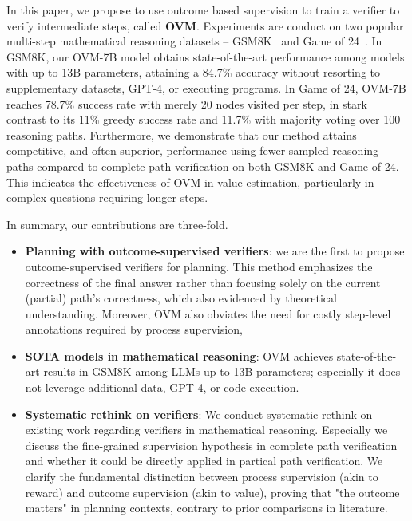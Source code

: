 \documentclass[11pt]{article}
\theoremstyle{plain}
\theoremstyle{claim}
\theoremstyle{rethinking}
\theoremstyle{researchquestion}
\theoremstyle{findings}
\theoremstyle{fact}
\theoremstyle{proper}
\theoremstyle{remark}
\begin{document}
In this paper, we propose to use outcome based supervision to train a verifier to verify intermediate steps, called \textbf{OVM}. Experiments are conduct on two popular multi-step mathematical reasoning datasets -- GSM8K~\citep{gsm8k21} and Game of 24~\citep{tot23}. In GSM8K, our OVM-7B model obtains state-of-the-art performance among models with up to 13B parameters, attaining a 84.7\% accuracy without resorting to supplementary datasets, GPT-4, or executing programs. 
In Game of 24,  OVM-7B reaches 78.7\% success rate with merely 20 nodes visited per step, in stark contrast to its 11\% greedy success rate and 11.7\% with majority voting over 100 reasoning paths. Furthermore, we demonstrate that our method attains competitive, and often superior, performance using fewer sampled reasoning paths compared to complete path verification on both GSM8K and Game of 24. This  indicates the effectiveness of OVM in value estimation, particularly in complex questions requiring longer steps.



In summary, our contributions are  three-fold.
\begin{itemize}

    


    \item  \textbf{Planning with outcome-supervised verifiers}: we are the first to propose   outcome-supervised verifiers for planning. This method emphasizes the correctness of the final answer rather than focusing solely on the current (partial) path’s correctness, which also evidenced by theoretical understanding. Moreover,  OVM also obviates the need for costly step-level annotations required by process supervision,
    
    \item \textbf{SOTA models in mathematical reasoning}:  OVM achieves state-of-the-art results in GSM8K among LLMs up to 13B parameters; especially it does not leverage  additional data, GPT-4, or code execution.
    


    \item \textbf{Systematic rethink on verifiers}: We conduct systematic rethink on existing work regarding verifiers in mathematical reasoning. Especially we discuss the fine-grained supervision hypothesis in complete path verification and whether it could be directly applied in  partical path verification.   We clarify the fundamental distinction between process supervision (akin to reward) and outcome supervision (akin to value), proving that "the outcome matters" in planning contexts, contrary to prior comparisons in literature.

    
    
\end{itemize}
\end{document}
